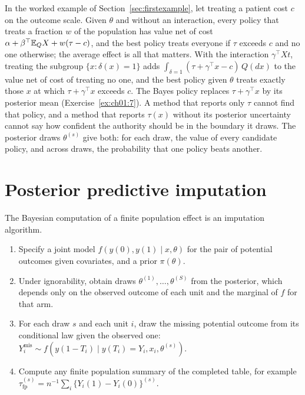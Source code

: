 In the worked example of Section~\ref{sec:firstexample}, let treating a patient cost $c$ on the outcome scale. Given $\theta$ and without an interaction, every policy that treats a fraction $w$ of the population has value net of cost $\alpha + \beta^\top \mathbb{E}_Q X + w(\tau - c)$, and the best policy treats everyone if $\tau$ exceeds $c$ and no one otherwise; the average effect is all that matters. With the interaction $\gamma^\top X t$, treating the subgroup $\{x : \delta(x) = 1\}$ adds $\int_{\delta = 1} (\tau + \gamma^\top x - c)\,Q(dx)$ to the value net of cost of treating no one, and the best policy given $\theta$ treats exactly those $x$ at which $\tau + \gamma^\top x$ exceeds $c$. The Bayes policy replaces $\tau + \gamma^\top x$ by its posterior mean (Exercise~\ref{ex:ch01:7}). A method that reports only $\tau$ cannot find that policy, and a method that reports $\tau(x)$ without its posterior uncertainty cannot say how confident the authority should be in the boundary it draws. The posterior draws $\theta^{(s)}$ give both: for each draw, the value of every candidate policy, and across draws, the probability that one policy beats another.

\section{Posterior predictive imputation}\label{sec:imputation}

The Bayesian computation of a finite population effect is an imputation algorithm.

\begin{enumerate}
\item Specify a joint model $f(y(0), y(1) \mid x, \theta)$ for the pair of potential outcomes given covariates, and a prior $\pi(\theta)$.
\item Under ignorability, obtain draws $\theta^{(1)}, \ldots, \theta^{(S)}$ from the posterior, which depends only on the observed outcome of each unit and the marginal of $f$ for that arm.
\item For each draw $s$ and each unit $i$, draw the missing potential outcome from its conditional law given the observed one: $Y_i^{\mathrm{mis}} \sim f(y(1 - T_i) \mid y(T_i) = Y_i, x_i, \theta^{(s)})$.
\item Compute any finite population summary of the completed table, for example $\tau_{\mathrm{fp}}^{(s)} = n^{-1}\sum_i\{Y_i(1) - Y_i(0)\}^{(s)}$.
\end{enumerate}


